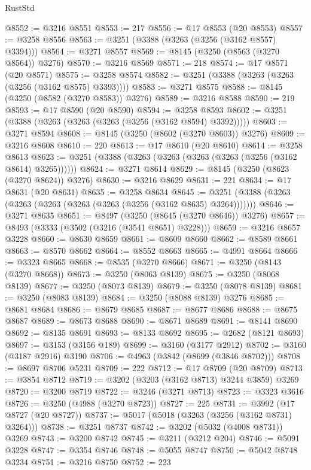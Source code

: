 \begin{lexlean}{RustStd}
\begin{coremodule}
@8552 := @3216 @8551
@8553 := 217
@8556 := @17 @8553 (@20 @8553)
@8557 := @3258 @8556
@8563 := @3251 (@3388 (@3263 (@3256 (@3162 @8557) @3394)))
@8564 := @3271 @8557
@8569 := @8145 (@3250 (@8563 (@3270 @8564)) @3276)
@8570 := @3216 @8569
@8571 := 218
@8574 := @17 @8571 (@20 @8571)
@8575 := @3258 @8574
@8582 := @3251 (@3388 (@3263 (@3263 (@3256 (@3162 @8575) @3393))))
@8583 := @3271 @8575
@8588 := @8145 (@3250 (@8582 (@3270 @8583)) @3276)
@8589 := @3216 @8588
@8590 := 219
@8593 := @17 @8590 (@20 @8590)
@8594 := @3258 @8593
@8602 := @3251 (@3388 (@3263 (@3263 (@3263 (@3256 (@3162 @8594) @3392)))))
@8603 := @3271 @8594
@8608 := @8145 (@3250 (@8602 (@3270 @8603)) @3276)
@8609 := @3216 @8608
@8610 := 220
@8613 := @17 @8610 (@20 @8610)
@8614 := @3258 @8613
@8623 := @3251 (@3388 (@3263 (@3263 (@3263 (@3263 (@3256 (@3162 @8614) @3265))))))
@8624 := @3271 @8614
@8629 := @8145 (@3250 (@8623 (@3270 @8624)) @3276)
@8630 := @3216 @8629
@8631 := 221
@8634 := @17 @8631 (@20 @8631)
@8635 := @3258 @8634
@8645 := @3251 (@3388 (@3263 (@3263 (@3263 (@3263 (@3263 (@3256 (@3162 @8635) @3264)))))))
@8646 := @3271 @8635
@8651 := @8497 (@3250 (@8645 (@3270 @8646)) @3276)
@8657 := @8493 (@3333 (@3502 (@3216 (@3541 @8651) @3228)))
@8659 := @3216 @8657 @3228
@8660 := @8630 @8659
@8661 := @8609 @8660
@8662 := @8589 @8661
@8663 := @8570 @8662
@8664 := @8552 @8663
@8665 := @4991 @8664
@8666 := @3323 @8665
@8668 := @8535 (@3270 @8666)
@8671 := @3250 (@8143 (@3270 @8668))
@8673 := @3250 (@8063 @8139)
@8675 := @3250 (@8068 @8139)
@8677 := @3250 (@8073 @8139)
@8679 := @3250 (@8078 @8139)
@8681 := @3250 (@8083 @8139)
@8684 := @3250 (@8088 @8139) @3276
@8685 := @8681 @8684
@8686 := @8679 @8685
@8687 := @8677 @8686
@8688 := @8675 @8687
@8689 := @8673 @8688
@8690 := @8671 @8689
@8691 := @8141 @8690
@8692 := @8135 @8691
@8693 := @8133 @8692
@8695 := @2682 (@8121 @8693)
@8697 := @3153 (@3156 @189)
@8699 := @3160 (@3177 @2912)
@8702 := @3160 (@3187 @2916) @3190
@8706 := @4963 (@3842 (@8699 (@3846 @8702)))
@8708 := @8697 @8706 @5231
@8709 := 222
@8712 := @17 @8709 (@20 @8709)
@8713 := @3854 @8712
@8719 := @3202 (@3203 (@3162 @8713) @3244 @3859) @3269
@8720 := @3200 @8719
@8722 := @3246 (@3271 @8713)
@8723 := @3323 @3616
@8726 := @3250 (@4988 (@3270 @8723))
@8727 := 225
@8731 := @3992 (@17 @8727 (@20 @8727))
@8737 := @5017 (@5018 (@3263 (@3256 (@3162 @8731) @3264)))
@8738 := @3251 @8737
@8742 := @3202 (@5032 (@4008 @8731)) @3269
@8743 := @3200 @8742
@8745 := @3211 (@3212 @204)
@8746 := @5091 @3228
@8747 := @3354 @8746
@8748 := @5055 @8747
@8750 := @5042 @8748 @3234
@8751 := @3216 @8750
@8752 := 223

\end{coremodule}
\end{lexlean}

